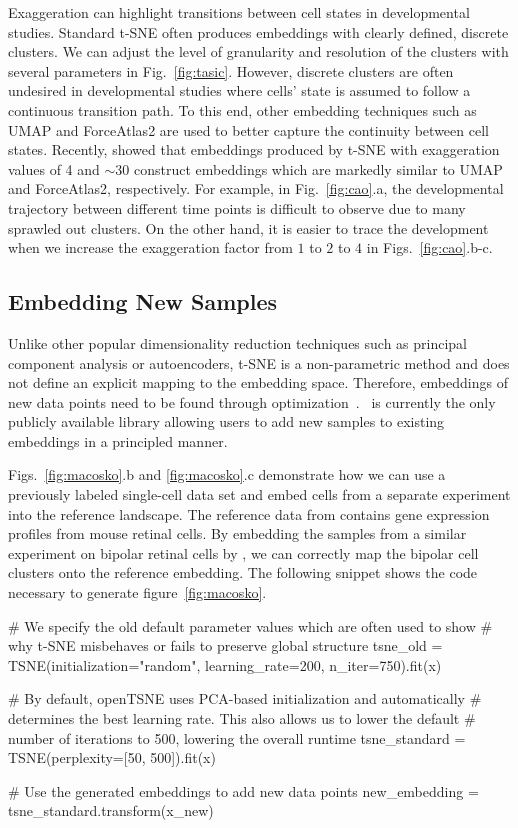 \documentclass[article]{jss}
\newcommand{\opentsne}{\pkg{openTSNE}}
\begin{document}
Exaggeration can highlight transitions between cell states in developmental
studies. Standard t-SNE often produces embeddings with clearly defined, discrete
clusters. We can adjust the level of granularity and resolution of the clusters
with several parameters in Fig.~\ref{fig:tasic}. However, discrete clusters are
often undesired in developmental studies where cells' state is assumed to follow
a continuous transition path. To this end, other embedding techniques such as
UMAP and ForceAtlas2 are used to better capture the continuity between cell
states. Recently, \citet{bohm2020unifying} showed that
embeddings produced by t-SNE with exaggeration values of 4 and $\sim30$
construct embeddings which are markedly similar to UMAP and ForceAtlas2,
respectively. For example, in Fig.~\ref{fig:cao}.a, the developmental trajectory
between different time points is difficult to observe due to many sprawled out
clusters. On the other hand, it is easier to trace the development when we
increase the exaggeration factor from $1$ to $2$ to $4$ in
Figs.~\ref{fig:cao}.b-c.

\subsection{Embedding New Samples}

Unlike other popular dimensionality reduction techniques such as principal
component analysis or autoencoders, t-SNE is a non-parametric method and does
not define an explicit mapping to the embedding space. Therefore, embeddings of
new data points need to be found through
optimization~\citep{policar2021embedding}. \opentsne\ is currently the only
publicly available library allowing users to add new samples to existing
embeddings in a principled manner.

Figs.~\ref{fig:macosko}.b and \ref{fig:macosko}.c demonstrate how we can use a
previously labeled single-cell data set and embed cells from a separate
experiment into the reference landscape. The reference data from
\citet{macosko2015highly} contains gene expression
profiles from mouse retinal cells. By embedding the samples from a similar
experiment on bipolar retinal cells by \citet{shekhar2016comprehensive}, we can correctly map the bipolar cell
clusters onto the reference embedding. The following snippet shows the code necessary to generate figure~\ref{fig:macosko}.
\begin{CodeChunk}
\begin{CodeInput}
# We specify the old default parameter values which are often used to show
# why t-SNE misbehaves or fails to preserve global structure
tsne_old = TSNE(initialization="random", learning_rate=200, n_iter=750).fit(x)

# By default, openTSNE uses PCA-based initialization and automatically
# determines the best learning rate. This also allows us to lower the default
# number of iterations to 500, lowering the overall runtime
tsne_standard = TSNE(perplexity=[50, 500]).fit(x)

# Use the generated embeddings to add new data points
new_embedding = tsne_standard.transform(x_new)
\end{CodeInput}
\end{CodeChunk}
\end{document}
